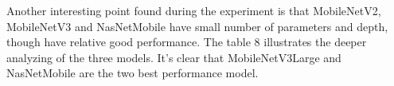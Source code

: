 Another interesting point found during the experiment is that MobileNetV2, MobileNetV3 and NasNetMobile have small number of parameters and depth, though have relative good performance. The table 8 illustrates the deeper analyzing of the three models. It's clear that MobileNetV3Large and NasNetMobile are the two best performance model.
\FloatBarrier
